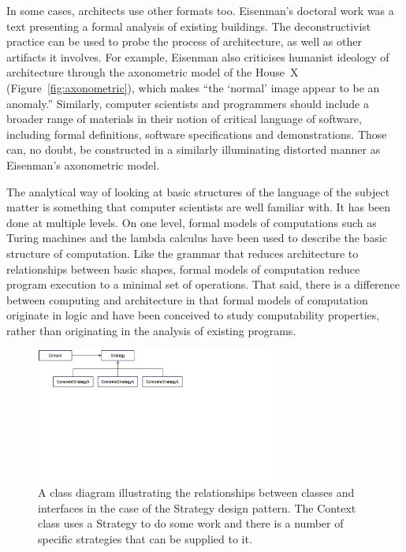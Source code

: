 In some cases, architects use other formats too. Eisenman's doctoral work was a text presenting
a formal analysis of existing buildings. The deconstructivist practice can be used to probe the
process of architecture, as well as other artifacts it involves. For example,
Eisenman also criticises humanist ideology of architecture through the
axonometric model of the House~X (Figure~\ref{fig:axonometric}), which makes
``the `normal' image appear to be an anomaly.''
Similarly, computer scientists and programmers should include a broader range of materials in
their notion of critical language of software, including formal definitions, software
specifications and demonstrations. Those can, no doubt, be constructed in a similarly
illuminating distorted manner as Eisenman's axonometric model.

The analytical way of looking at basic structures of the language of the subject matter is something
that computer scientists are well familiar with. It has been done at multiple levels. On one
level, formal models of computations such as Turing machines and the lambda calculus have been
used to describe the basic structure of computation. Like the grammar that reduces architecture
to relationships between basic shapes, formal models of computation reduce program execution to
a minimal set of operations. That said, there is a difference between computing and architecture
in that formal models of computation originate in logic and have been conceived to study
computability properties, rather than originating in the analysis of existing programs.

\begin{figure}
\centering
\includegraphics[width=0.7\textwidth,trim=0cm 13.5cm 12.5cm 0cm,clip]{fig/strategy.pdf}
\caption{A class diagram illustrating the relationships between classes and interfaces in the
case of the Strategy design pattern. The Context class uses a Strategy to do some work and
there is a number of specific strategies that can be supplied to it.}
\label{fig:strategy}
\end{figure}

